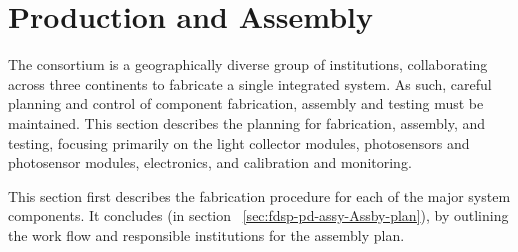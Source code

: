\section{Production and Assembly}
\label{sec:fdsp-pd-prod-assy}
The \single {} consortium is a geographically diverse group of institutions, collaborating across three continents to fabricate a single integrated system.  As such, careful planning and control of component fabrication, assembly and testing must be maintained.
This section describes the planning for fabrication, assembly, and testing, focusing primarily on the  light collector modules, photosensors and photosensor modules, electronics, and calibration and monitoring.

 
This section first describes the fabrication procedure for each of the major  system components.  It concludes (in section ~\ref{sec:fdsp-pd-assy-Assby-plan}), by outlining the work flow and responsible institutions for the assembly plan.





